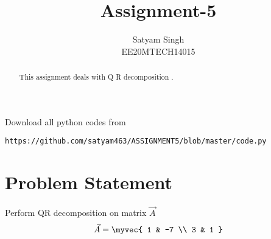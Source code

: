 \documentclass[journal,12pt,twocolumn]{IEEEtran}
\begin{document}
\renewcommand{\thefigure}{\theproblem}
\def\putbox#1#2#3{\makebox[0in][l]{\makebox[#1][l]{}\raisebox{\baselineskip}[0in][0in]{\raisebox{#2}[0in][0in]{#3}}}}
     \def\rightbox#1{\makebox[0in][r]{#1}}
     \def\centbox#1{\makebox[0in]{#1}}
     \def\topbox#1{\raisebox{-\baselineskip}[0in][0in]{#1}}
     \def\midbox#1{\raisebox{-0.5\baselineskip}[0in][0in]{#1}}
\vspace{3cm}
\title{Assignment-5}
\author{Satyam Singh \\ EE20MTECH14015}
\maketitle
\newpage
\bigskip
\renewcommand{\thefigure}{\theenumi}
\renewcommand{\thetable}{\theenumi}
\begin{abstract}
This assignment deals with Q R decomposition .
\end{abstract}
Download all python codes from 
\begin{lstlisting}
https://github.com/satyam463/ASSIGNMENT5/blob/master/code.py
\end{lstlisting}
\section{Problem Statement}
 Perform QR decomposition on matrix $\vec{A}$
\begin{align}
    \vec{A}=\myvec{ 1 & -7 \\ 3 & 1 }\label{givmat}
\end{align}
\end{document}
